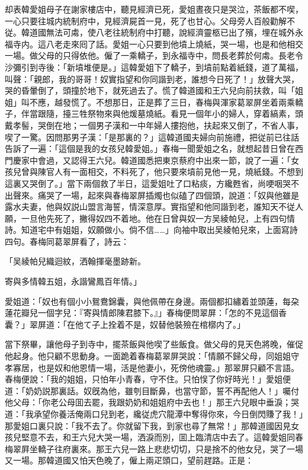 却表韓愛姐母子在謝家樓店中，聽見經濟已死，愛姐晝夜只是哭泣，茶飯都不喫，一心只要往城内統制府中，見經濟屍首一見，死了也甘心。父母旁人百般勸解不従。韓道國無法可䖏，使八老往統制府中打聽，說經濟靈柩已出了殯，埋在城外永福寺内。這八老走來囘了話。愛姐一心只要到他墳上燒紙，哭一場，也是和他相交一場。做父母的只得依他。僱了一乘轎子，到永福寺中，問長老葬於何䖏。長老令沙彌引到寺後：「新墳堆便是。」這韓愛姐下了轎子，到墳前點着紙錢，道了萬福，叫聲：「親郎，我的哥哥！奴實指望和你同諧到老，誰想今日死了！」放聲大哭，哭的昏暈倒了，頭撞於地下，就死過去了。慌了韓道國和王六兒向前扶救，叫「姐姐」叫不應，越發慌了。不想那日，正是葬了三日，春梅與渾家葛翠屏坐着兩乘轎子，伴當跟隨，擡三牲祭物來與他煖墓燒紙。看見一個年小的婦人，穿着縞素，頭戴孝髻，哭倒在地；一個男子漢和一中年婦人摟抱他，扶起來又倒了，不省人事，喫了一驚。因問那男子漢：「是那裏的？」這韓道國夫婦向前施禮，把従前已往話告訴了一遍：「這個是我的女孩兒韓愛姐。」春梅一聞愛姐之名，就想起昔日曾在西門慶家中會過，又認得王六兒。韓道國悉把東京蔡府中出來一節，說了一遍：「女孩兒曾與陳官人有一面相交，不料死了，他只要來墳前見他一見，燒紙錢。不想到這裏又哭倒了。」當下兩個救了半日，這愛姐吐了口粘痰，方纔甦省，尚哽咽哭不出聲來。痛哭了一場，起來與春梅翠屏插燭也似磕了四個頭，說道：「奴與他雖是露水夫妻，他與奴説山盟言海誓，情深意厚。實指望和他同諧到老，誰知天不従人願，一旦他先死了，撇得奴四不着地。他在日曾與奴一方吴綾帕兒，上有四句情詩。知道宅中有姐姐，奴願做小。倘不信……」向袖中取出吴綾帕兒來，上面寫詩四句。春梅同葛翠屏看了，詩云：

「吴綾帕兒織迴紋，洒翰揮毫墨跡新。

寄與多情韓五姐，永諧鸞鳳百年情。」

愛姐道：「奴也有個小小鴛鴦錦囊，與他佩帶在身邊。兩個都扣繡着並頭蓮，每朶蓮花瓣兒一個字兒：『寄與情郎陳君膝下。』」春梅便問翠屏：「怎的不見這個香囊？」翠屏道：「在他て子上拴着不是，奴替他裝殮在棺槨内了。」

當下祭畢，讓他母子到寺中，擺茶飯與他喫了些飯食。做父母的見天色將晚，催促他起身。他只顧不思動身。一面跪着春梅葛翠屏哭說：「情願不歸父母，同姐姐守孝寡居，也是奴和他恩情一場，活是他妻小，死傍他魂靈。」那翠屏只顧不言語。春梅便說：「我的姐姐，只怕年小青春，守不住。只怕悮了你好時光！」愛姐便道：「奶奶説那裏話。奴旣為他，雖刳目斷鼻，也當守節，誓不再配他人！」囑付他父母：「你老公母囬去罷，我跟奶奶和姐姐府中去也！」那王六兒眼中垂淚；哭道：「我承望你養活俺兩口兒到老，纔従虎穴龍潭中奪得你來，今日倒閃賺了我！」那愛姐口裏只說：「我不去了。你就留下我，到家也尋了無常！」那韓道國因見女孩兒堅意不去，和王六兒大哭一場，洒淚而別，囬上臨清店中去了。這韓愛姐同春梅翠屛坐轎子往府裏來。那王六兒一路上悲悲切切，只是捨不的他女兒，哭了一場又一場。那韓道國又怕天色晚了，僱上兩疋頭口，望前趕路。正是：

